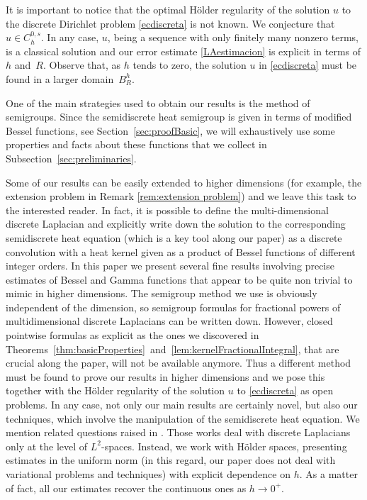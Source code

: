 \documentclass[a4paper,11pt,reqno]{amsart}
\theoremstyle{definition}
\numberwithin{equation}{section}
\begin{document}
It is important to notice that the optimal H\"older regularity of the solution
$u$ to the discrete Dirichlet problem \eqref{ecdiscreta} is not known.
We conjecture that $u\in C^{0,s}_h$. In any case, $u$,
being a sequence with only finitely many nonzero terms,
is a classical solution and our error estimate \eqref{LAestimacion} is explicit in terms of $h$ and~$R$.
Observe that, as $h$ tends to zero, the solution $u$ in \eqref{ecdiscreta}
must be found in a larger domain~$B_R^h$.

One of the main strategies used to obtain our results is the method of semigroups. Since the
semidiscrete heat semigroup is given in terms of modified Bessel functions, see Section~\ref{sec:proofBasic},
we will exhaustively use some properties and facts about these functions that we collect
in Subsection~\ref{sec:preliminaries}.

Some of our results can be easily extended
to higher dimensions (for example, the extension problem in Remark \ref{rem:extension problem})
and we leave this task to the interested reader.
In fact, it is possible to define the multi-dimensional discrete Laplacian and explicitly write down the
solution to the corresponding semidiscrete heat equation (which is
a key tool along our paper) as a discrete convolution
with a heat kernel given as a product of Bessel functions of different integer orders.
In this paper we present several fine results involving precise
estimates of Bessel and Gamma functions that appear to be quite
non trivial to mimic in higher dimensions.
The semigroup method we use is obviously independent of the dimension,
so semigroup formulas for fractional powers of multidimensional discrete Laplacians
can be written down.
However, closed pointwise formulas as explicit as the ones we discovered in
Theorems~\ref{thm:basicProperties}~and~\ref{lem:kernelFractionalIntegral},
that are crucial along the paper, will not be available anymore. Thus a different method must be found
to prove our results in higher dimensions and we pose this together with 
the H\"older regularity of the solution $u$ to \eqref{ecdiscreta}
as open problems. In any case, not only our main results are certainly novel,
but also our techniques, which involve the manipulation of the semidiscrete heat equation.
We mention related questions raised in \cite{japoneses, Zoia}. Those works deal
with discrete Laplacians only at the level of $L^2$-spaces. Instead, we work with H\"older
spaces, presenting estimates in the uniform norm (in this regard, our paper does not deal
with variational problems and techniques) with explicit dependence on $h$.
As a matter of fact, all our estimates recover the continuous ones as $h\to0^+$.
\end{document}
